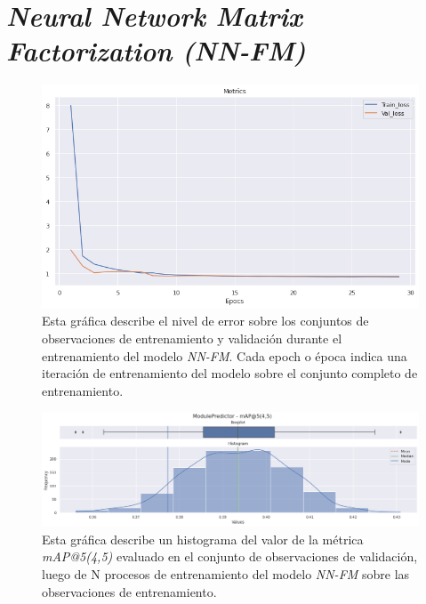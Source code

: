\documentclass[11pt,a4paper,twoside]{thesis}
\begin{document}
\section{\textit{Neural Network Matrix Factorization (NN-FM)}}

\begin{figure}[h!]
	\centering
	\includegraphics[width=13cm]{./images/metrics-NN-FM-train-val-loss.png}
	\caption{Esta gráfica describe el nivel de error sobre los
		conjuntos de observaciones de entrenamiento y validación durante
		el entrenamiento del modelo \textit{NN-FM}. Cada epoch o época
		indica una iteración de entrenamiento del modelo sobre el conjunto
		completo de entrenamiento.}
\end{figure}

\clearpage

\begin{figure}[h!]
	\centering
	\includegraphics[width=15cm]{./images/metrics-NN-FM-mapk.png}
	\caption{Esta gráfica describe un histograma del valor de la
		métrica \textit{mAP@5(4,5)} evaluado en el conjunto de
		observaciones de validación, luego de N procesos de
		entrenamiento del modelo \textit{NN-FM} sobre las observaciones
		de entrenamiento.}
\end{figure}
\end{document}
